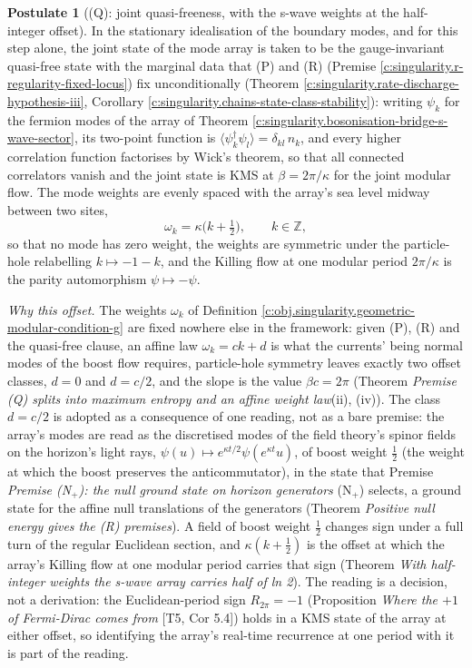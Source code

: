\documentclass[11pt]{article}
\theoremstyle{definition}
\newtheorem{postulate}[theorem]{Postulate}
\theoremstyle{plain}
\newcommand{\changedmark}[2]{\marginpar{\raggedright\scriptsize\color{#1}#2}}
\providecommand{\Z}{}\renewcommand{\Z}{\mathbb{Z}}
\begin{document}
\begin{postulate}[(Q): joint quasi-freeness, with the s-wave weights at the half-integer offset]\label{c:singularity.q-joint-quasi-freeness-s-wave}
\changedmark{BurntOrange}{changed since the deposit}
In the stationary idealisation of the boundary modes, and for this step alone, the joint state of the mode array is taken to be the gauge-invariant quasi-free state with the marginal data that (P) and (R) (Premise \ref{c:singularity.r-regularity-fixed-locus}) fix unconditionally (Theorem \ref{c:singularity.rate-discharge-hypothesis-iii}, Corollary \ref{c:singularity.chains-state-class-stability}): writing $\psi_k$ for the fermion modes of the array of Theorem \ref{c:singularity.bosonisation-bridge-s-wave-sector}, its two-point function is $\langle \psi^\dagger_k \psi_l \rangle = \delta_{kl}\,n_k$, and every higher correlation function factorises by Wick's theorem, so that all connected correlators vanish and the joint state is KMS at $\beta = 2\pi/\kappa$ for the joint modular flow. The mode weights are evenly spaced with the array's sea level midway between two sites,
\[
\omega_k = \kappa\bigl(k + \tfrac12\bigr), \qquad k \in \Z ,
\]
so that no mode has zero weight, the weights are symmetric under the particle-hole relabelling $k \mapsto -1-k$, and the Killing flow at one modular period $2\pi/\kappa$ is the parity automorphism $\psi \mapsto -\psi$.

\emph{Why this offset.} The weights $\omega_k$ of Definition \ref{c:obj.singularity.geometric-modular-condition-g} are fixed nowhere else in the framework: given (P), (R) and the quasi-free clause, an affine law $\omega_k = ck + d$ is what the currents' being normal modes of the boost flow requires, particle-hole symmetry leaves exactly two offset classes, $d = 0$ and $d = c/2$, and the slope is the value $\beta c = 2\pi$ (Theorem \emph{Premise (Q) splits into maximum entropy and an affine weight law}(ii), (iv)). The class $d = c/2$ is adopted as a consequence of one reading, not as a bare premise: the array's modes are read as the discretised modes of the field theory's spinor fields on the horizon's light rays, $\psi(u) \mapsto e^{\kappa t/2}\psi(e^{\kappa t}u)$, of boost weight $\tfrac12$ (the weight at which the boost preserves the anticommutator), in the state that Premise \emph{Premise (N$_{+}$): the null ground state on horizon generators} (N$_{+}$) selects, a ground state for the affine null translations of the generators (Theorem \emph{Positive null energy gives the (R) premises}). A field of boost weight $\tfrac12$ changes sign under a full turn of the regular Euclidean section, and $\kappa(k + \tfrac12)$ is the offset at which the array's Killing flow at one modular period carries that sign (Theorem \emph{With half-integer weights the s-wave array carries half of ln 2}). The reading is a decision, not a derivation: the Euclidean-period sign $R_{2\pi} = -1$ (Proposition \emph{Where the $+1$ of Fermi-Dirac comes from} [T5, Cor 5.4]) holds in a KMS state of the array at either offset, so identifying the array's real-time recurrence at one period with it is part of the reading.


\end{postulate}
\end{document}
